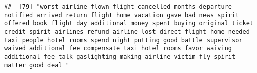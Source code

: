 \documentclass[
]{article}
\begin{document}
\begin{verbatim}
##  [79] "worst airline flown flight cancelled months departure notified arrived return flight home vacation gave bad news spirit offered book flight day additional money spent buying original ticket credit spirit airlines refund airline lost direct flight home needed taxi people hotel rooms spend night putting good battle supervisor waived additional fee compensate taxi hotel rooms favor waiving additional fee talk gaslighting making airline victim fly spirit matter good deal "                                                                                                                                                                                                                                                                                                                                                                                                                                                                                                                                                                                                                                                                                                                                                                                                                                                                                                                                                                                                                                                                                                                                                                                                                                                                                                      

\end{verbatim}
\end{document}

